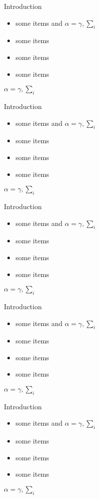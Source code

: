 \documentclass{beamer}
\begin{document}
\begin{frame}{}
\begin{columns}[T]
\begin{column}{.48\linewidth}
\begin{block}{Introduction}
\begin{itemize}
\item some items and $\alpha=\gamma, \sum_{i}$
\item some items
\item some items
\item some items
\end{itemize}
$\alpha=\gamma, \sum_{i}$
\end{block}
\begin{block}{Introduction}
\begin{itemize}
\item some items and $\alpha=\gamma, \sum_{i}$
\item some items
\item some items
\item some items
\end{itemize}
$\alpha=\gamma, \sum_{i}$
\end{block}
\begin{block}{Introduction}
\begin{itemize}
\item some items and $\alpha=\gamma, \sum_{i}$
\item some items
\item some items
\item some items
\end{itemize}
$\alpha=\gamma, \sum_{i}$
\end{block}
\begin{block}{Introduction}
\begin{itemize}
\item some items and $\alpha=\gamma, \sum_{i}$
\item some items
\item some items
\item some items
\end{itemize}
$\alpha=\gamma, \sum_{i}$
\end{block}
\begin{block}{Introduction}
\begin{itemize}
\item some items and $\alpha=\gamma, \sum_{i}$
\item some items
\item some items
\item some items
\end{itemize}
$\alpha=\gamma, \sum_{i}$
\end{block}


\end{column}
\end{columns}
\end{frame}
\end{document}

